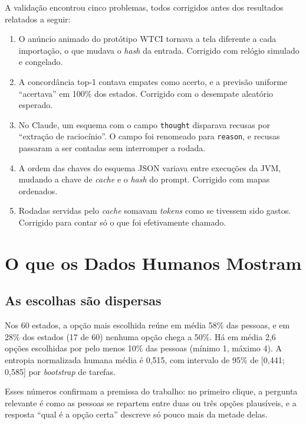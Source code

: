 \documentclass[12pt,oneside,a4paper,chapter=TITLE,english,brazil]{abntex2}
\newcommand{\code}[1]{\texttt{#1}}
\begin{document}
A validação encontrou cinco problemas, todos corrigidos antes dos resultados relatados a seguir:

\begin{enumerate}
\item O anúncio animado do protótipo WTCI tornava a tela diferente a cada importação, o que mudava o \textit{hash} da entrada. Corrigido com relógio simulado e congelado.
\item A concordância top-1 contava empates como acerto, e a previsão uniforme ``acertava'' em 100\% dos estados. Corrigido com o desempate aleatório esperado.
\item No Claude, um esquema com o campo \code{thought} disparava recusas por ``extração de raciocínio''. O campo foi renomeado para \code{reason}, e recusas passaram a ser contadas sem interromper a rodada.
\item A ordem das chaves do esquema JSON variava entre execuções da JVM, mudando a chave de \textit{cache} e o \textit{hash} do prompt. Corrigido com mapas ordenados.
\item Rodadas servidas pelo \textit{cache} somavam \textit{tokens} como se tivessem sido gastos. Corrigido para contar só o que foi efetivamente chamado.
\end{enumerate}

\section{O que os Dados Humanos Mostram}
\label{sec:humanos}

\subsection{As escolhas são dispersas}

\begin{real}
Nos 60 estados, a opção mais escolhida reúne em média 58\% das pessoas, e em 28\% dos estados (17 de 60) nenhuma opção chega a 50\%. Há em média 2,6 opções escolhidas por pelo menos 10\% das pessoas (mínimo 1, máximo 4). A entropia normalizada humana média é 0,515, com intervalo de 95\% de [0,441; 0,585] por \textit{bootstrap} de tarefas.
\end{real}

Esses números confirmam a premissa do trabalho: no primeiro clique, a pergunta relevante é como as pessoas se repartem entre duas ou três opções plausíveis, e a resposta ``qual é a opção certa'' descreve só pouco mais da metade delas.
\end{document}
